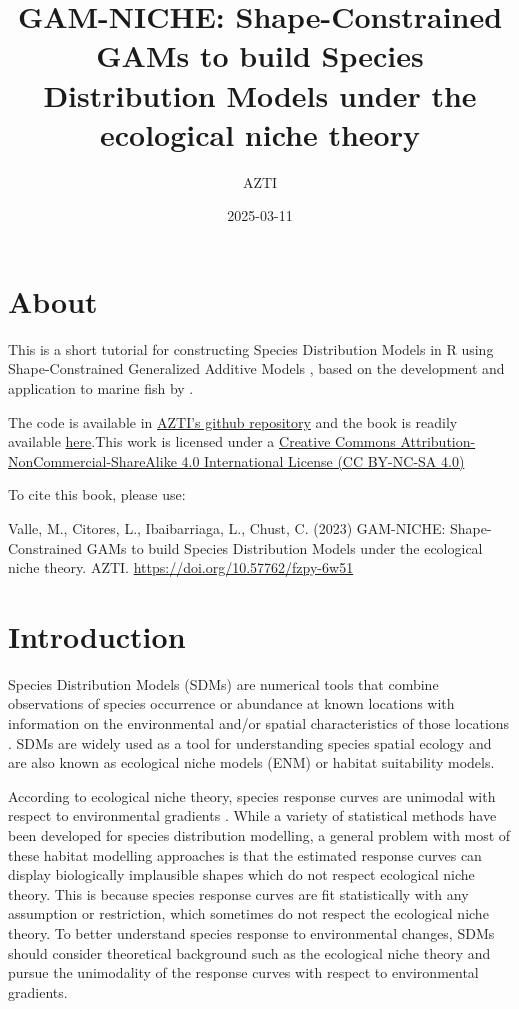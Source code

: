 \documentclass[
]{book}
\title{GAM-NICHE: Shape-Constrained GAMs to build Species Distribution Models under the ecological niche theory}
\author{AZTI}
\date{2025-03-11}
\begin{document}
\maketitle

{
\setcounter{tocdepth}{1}
\tableofcontents
}
\chapter*{About}\label{about}

This is a short tutorial for constructing Species Distribution Models in R using Shape-Constrained Generalized Additive Models \citep{pya_etal_2015}, based on the development and application to marine fish by \citet{citores_etal_2020}.

The code is available in \href{https://github.com/Fundacion-AZTI/gam-niche}{AZTI's github repository} and the book is readily available \href{https://fundacion-azti.github.io/gam-niche/}{here}.This work is licensed under a \href{https://creativecommons.org/licenses/by-nc-sa/4.0/}{Creative Commons Attribution-NonCommercial-ShareAlike 4.0 International License (CC BY-NC-SA 4.0)}

To cite this book, please use:

Valle, M., Citores, L., Ibaibarriaga, L., Chust, C. (2023) GAM-NICHE: Shape-Constrained GAMs to build Species Distribution Models under the ecological niche theory. AZTI. \url{https://doi.org/10.57762/fzpy-6w51}

\chapter{Introduction}\label{introduction}

Species Distribution Models (SDMs) are numerical tools that combine observations of species occurrence or abundance at known locations with information on the environmental and/or spatial characteristics of those locations \citep{elith_etal_2009}. SDMs are widely used as a tool for understanding species spatial ecology and are also known as ecological niche models (ENM) or habitat suitability models.

According to ecological niche theory, species response curves are unimodal with respect to environmental gradients \citep{hutchinson_1957}. While a variety of statistical methods have been developed for species distribution modelling, a general problem with most of these habitat modelling approaches is that the estimated response curves can display biologically implausible shapes which do not respect ecological niche theory. This is because species response curves are fit statistically with any assumption or restriction, which sometimes do not respect the ecological niche theory. To better understand species response to environmental changes, SDMs should consider theoretical background such as the ecological niche theory and pursue the unimodality of the response curves with respect to environmental gradients.
\end{document}
